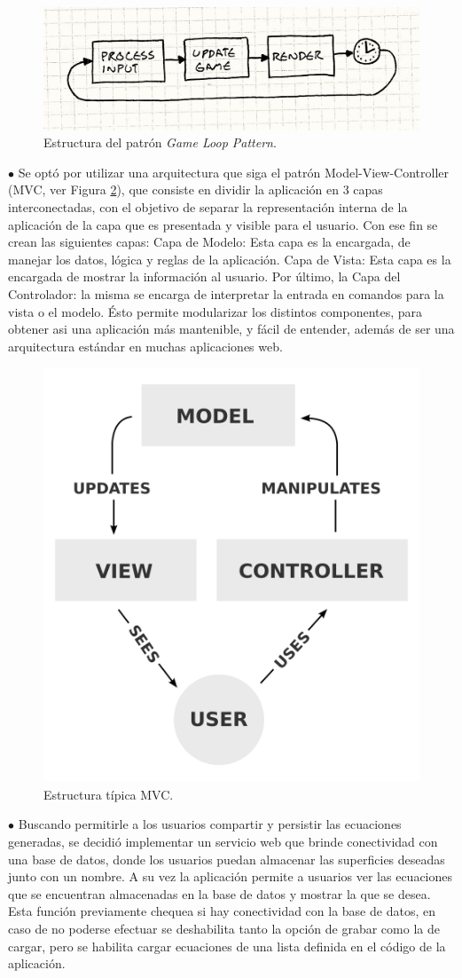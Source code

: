 \documentclass[12pt]{article}
\begin{document}
\begin{figure}[h]
\includegraphics[width =0.8\linewidth, center]{gameloop.png}
\caption{Estructura del patrón \textit{Game Loop Pattern}\cite{patterns}.}
\label{glp}
\end{figure}

$\bullet$ Se optó por utilizar una arquitectura que siga el patrón Model-View-Controller (MVC, ver Figura \ref{mvc}), que consiste en dividir la aplicación en 3 capas interconectadas, con el objetivo de separar la representación interna de la aplicación de la capa que es presentada y visible para el usuario. Con ese fin se crean las siguientes capas: Capa de Modelo: Esta capa es la encargada, de manejar los datos, lógica y reglas de la aplicación. Capa de Vista: Esta capa es la encargada de mostrar la información al usuario. Por último, la Capa del Controlador: la misma se encarga de interpretar la entrada en comandos para la vista o el modelo.  Ésto permite modularizar los distintos componentes, para obtener asi una aplicación más mantenible, y fácil de entender, además de ser una arquitectura estándar en muchas aplicaciones web.


\begin{figure}[h!]
\includegraphics[width =0.5\linewidth, center]{mvc.png}
\caption{Estructura típica MVC.}
\label{mvc}
\end{figure}
$\bullet$ Buscando permitirle a los usuarios compartir y persistir las ecuaciones generadas, se decidió implementar un servicio web que brinde conectividad con una base de datos, donde los usuarios puedan almacenar las superficies deseadas junto con un nombre. A su vez la aplicación permite a usuarios ver las ecuaciones que se encuentran almacenadas en la base de datos y mostrar la que se desea. Esta función previamente chequea si hay conectividad con la base de datos, en caso de no poderse efectuar se deshabilita tanto la opción de grabar como la de cargar, pero se habilita cargar ecuaciones de una lista definida en el código de la aplicación. 
\end{document}
